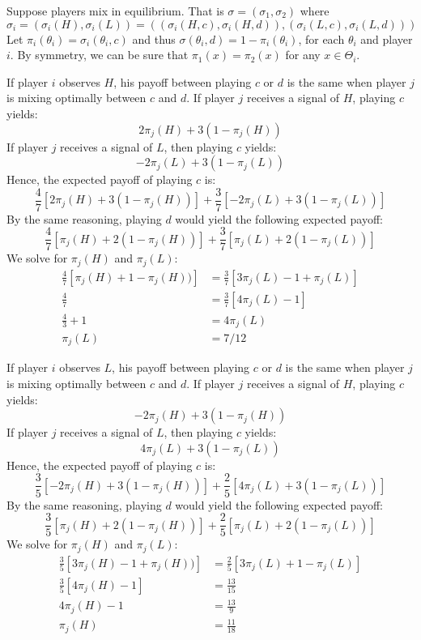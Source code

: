 \documentclass[12pt]{report}
\begin{document}
Suppose players mix in equilibrium. That is $\sigma = (\sigma_1, \sigma_2)$ where $$\sigma_i = (\sigma_i(H), \sigma_i(L)) = ((\sigma_i(H,c),\sigma_i(H,d)), (\sigma_i(L,c),\sigma_i(L,d))) $$
Let $\pi_i(\theta_i) = \sigma_i(\theta_i,c)$ and thus $\sigma(\theta_i,d) = 1 - \pi_i(\theta_i)$, for each $\theta_i$ and player $i$. By symmetry, we can be sure that $\pi_1(x) = \pi_2(x)$ for any $x\in\Theta_i$.

If player $i$ observes $H$, his payoff between playing $c$ or $d$ is the same when player $j$ is mixing optimally between $c$ and $d$. If player $j$ receives a signal of $H$, playing $c$ yields: $$2 \pi_j(H) + 3(1 - \pi_j(H)) $$ If player $j$ receives a signal of $L$, then playing $c$ yields: $$-2\pi_j(L) + 3(1 - \pi_j(L))$$ Hence, the expected payoff of playing $c$ is: $$\frac{4}{7}\left[2 \pi_j(H) + 3(1 - \pi_j(H))\right] + \frac{3}{7}\left[-2\pi_j(L) + 3(1 - \pi_j(L))\right] $$ By the same reasoning, playing $d$ would yield the following expected payoff: $$ \frac{4}{7}\left[ \pi_j(H) + 2(1 - \pi_j(H))\right] + \frac{3}{7}\left[\pi_j(L) + 2(1 - \pi_j(L))\right] $$ We solve for $\pi_j(H)$ and $\pi_j(L)$:\begin{align*}
\frac{4}{7}\left[\pi_j(H) + 1 - \pi_j(H)) \right] & = \frac{3}{7}\left[3\pi_j(L) - 1 + \pi_j(L)\right] \\
\frac{4}{7} & = \frac{3}{7}\left[4\pi_j(L) - 1\right] \\
\frac{4}{3} + 1 & = 4\pi_j(L) \\
\pi_j(L) & = 7/12
\end{align*}

If player $i$ observes $L$, his payoff between playing $c$ or $d$ is the same when player $j$ is mixing optimally between $c$ and $d$. If player $j$ receives a signal of $H$, playing $c$ yields: $$-2 \pi_j(H) + 3(1 - \pi_j(H)) $$ If player $j$ receives a signal of $L$, then playing $c$ yields: $$4\pi_j(L) + 3(1 - \pi_j(L))$$ Hence, the expected payoff of playing $c$ is: $$\frac{3}{5}\left[-2 \pi_j(H) + 3(1 - \pi_j(H))\right] + \frac{2}{5}\left[4\pi_j(L) + 3(1 - \pi_j(L))\right] $$ By the same reasoning, playing $d$ would yield the following expected payoff: $$ \frac{3}{5}\left[ \pi_j(H) + 2(1 - \pi_j(H))\right] + \frac{2}{5}\left[\pi_j(L) + 2(1 - \pi_j(L))\right] $$ We solve for $\pi_j(H)$ and $\pi_j(L)$:\begin{align*}
\frac{3}{5}\left[3\pi_j(H)- 1 + \pi_j(H)) \right] & = \frac{2}{5}\left[3\pi_j(L) + 1 - \pi_j(L)\right] \\
\frac{3}{5}\left[4\pi_j(H)- 1\right] & = \frac{13}{15} \\ 4\pi_j(H)- 1 & = \frac{13}{9} \\
\pi_j(H) & = \frac{11}{18}
\end{align*}
\end{document}
